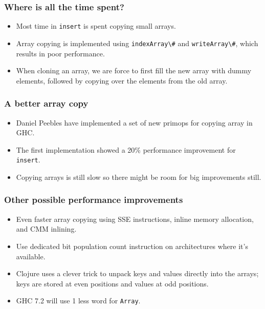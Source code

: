 \documentclass{beamer}
\begin{document}
\begin{frame}
  \frametitle{Where is all the time spent?}

  \begin{itemize}
  \item Most time in \lstinline!insert! is spent copying small arrays.
  \item Array copying is implemented using \lstinline!indexArray\#!
    and \lstinline!writeArray\#!, which results in poor performance.
  \item When cloning an array, we are force to first fill the new
    array with dummy elements, followed by copying over the elements
    from the old array.
  \end{itemize}
\end{frame}

\begin{frame}
  \frametitle{A better array copy}

  \begin{itemize}
  \item Daniel Peebles have implemented a set of new primops for
    copying array in GHC.
  \item The first implementation showed a 20\% performance improvement
    for \lstinline!insert!.
  \item Copying arrays is still slow so there might be room for big
    improvements still.
  \end{itemize}
\end{frame}

\begin{frame}
  \frametitle{Other possible performance improvements}
  \begin{itemize}
  \item Even faster array copying using SSE instructions, inline
    memory allocation, and CMM inlining.
  \item Use dedicated bit population count instruction on
    architectures where it's available.
  \item Clojure uses a clever trick to unpack keys and values directly
    into the arrays; keys are stored at even positions and values at
    odd positions.
  \item GHC 7.2 will use 1 less word for \lstinline!Array!.
  \end{itemize}
\end{frame}
\end{document}
